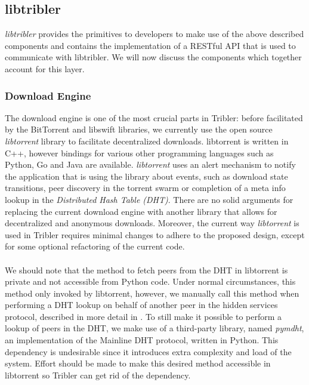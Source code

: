 \subsection{libtribler}
\emph{libtribler} provides the primitives to developers to make use of the above described components and contains the implementation of a RESTful API that is used to communicate with libtribler. We will now discuss the components which together account for this layer.

\subsubsection{\textbf{Download Engine}}
The download engine is one of the most crucial parts in Tribler: before facilitated by the BitTorrent and libswift libraries, we currently use the open source \emph{libtorrent} library to facilitate decentralized downloads. libtorrent is written in C++, however bindings for various other programming languages such as Python, Go and Java are available. \emph{libtorrent} uses an alert mechanism to notify the application that is using the library about events, such as download state transitions, peer discovery in the torrent swarm or completion of a meta info lookup in the \emph{Distributed Hash Table (DHT)}. There are no solid arguments for replacing the current download engine with another library that allows for decentralized and anonymous downloads. Moreover, the current way \emph{libtorrent} is used in Tribler requires minimal changes to adhere to the proposed design, except for some optional refactoring of the current code.\\\\
We should note that the method to fetch peers from the DHT in libtorrent is private and not accessible from Python code. Under normal circumstances, this method only invoked by libtorrent, however, we manually call this method when performing a DHT lookup on behalf of another peer in the hidden services protocol, described in more detail in \cite{ruigrok2015bittorrent}. To still make it possible to perform a lookup of peers in the DHT, we make use of a third-party library, named \emph{pymdht}, an implementation of the Mainline DHT protocol, written in Python. This dependency is undesirable since it introduces extra complexity and load of the system. Effort should be made to make this desired method accessible in libtorrent so Tribler can get rid of the dependency.

